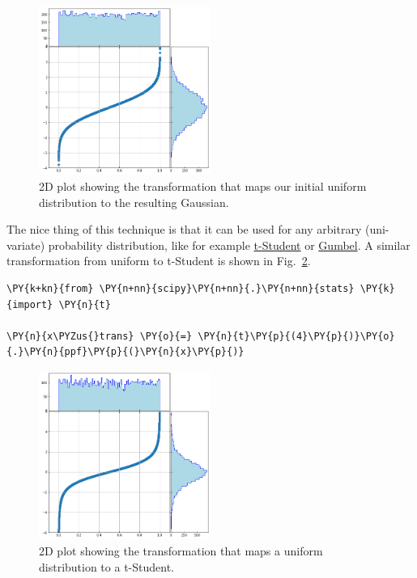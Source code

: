 \begin{figure}[htbp]
  \centering
  \includegraphics[width=0.5\textwidth]{figures/lesson6_7_0.png}
  \caption{2D plot showing the transformation that maps our initial uniform distribution to the resulting Gaussian.}
  \label{fig:uniform_to_gauss}
\end{figure}
    
The nice thing of this technique is that it can be used
for any arbitrary (uni-variate) probability distribution, like for
example \href{https://en.wikipedia.org/wiki/Student\%27s\_t-distribution}{t-Student}
or \href{https://en.wikipedia.org/wiki/Gumbel_distribution}{Gumbel}.
A similar transformation from uniform to t-Student is shown in Fig.~\ref{fig:uniform_to_tstudent}.

\begin{tcolorbox}[breakable, size=fbox, boxrule=1pt, pad at break*=1mm,colback=cellbackground, colframe=cellborder]
\begin{Verbatim}[commandchars=\\\{\}]
\PY{k+kn}{from} \PY{n+nn}{scipy}\PY{n+nn}{.}\PY{n+nn}{stats} \PY{k}{import} \PY{n}{t}

\PY{n}{x\PYZus{}trans} \PY{o}{=} \PY{n}{t}\PY{p}{(4}\PY{p}{)}\PY{o}{.}\PY{n}{ppf}\PY{p}{(}\PY{n}{x}\PY{p}{)}
\end{Verbatim}
\end{tcolorbox}

\begin{figure}[htbp]
  \centering
  \includegraphics[width=0.5\textwidth]{figures/lesson6_9_0.png}
  \caption{2D plot showing the transformation that maps a uniform distribution to a t-Student.}
  \label{fig:uniform_to_tstudent}
\end{figure}

